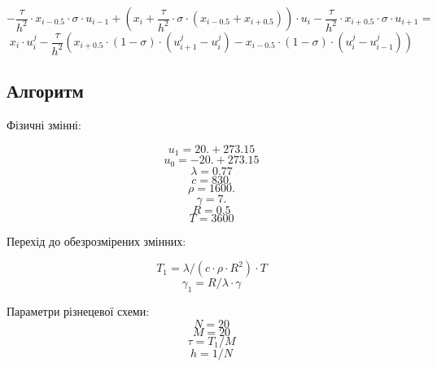 \documentclass[fontsize=14pt,DIV=1,a4paper]{scrartcl}
\begin{document}
	\begin{equation}
		- \frac{\tau}{h^2}\cdot x_{i-0.5}\cdot\sigma \cdot u_{i-1}
		+(x_i+\frac{\tau}{h^2}\cdot \sigma \cdot (x_{i-0.5}+x_{i+0.5}))\cdot u_i
		- \frac{\tau}{h^2}\cdot x_{i+0.5}\cdot\sigma \cdot u_{i+1}=
	\end{equation}
	\begin{equation}
		x_i \cdot u^j_i - \frac{\tau}{h^2}(
		  x_{i+0.5}\cdot(1- \sigma) \cdot (u^{j}_{i+1}-u^{j}_{i})
		- x_{i-0.5}\cdot(1- \sigma) \cdot (u^{j}_i    -u^{j}_{i-1}))
	\end{equation}
			
	\newpage
	\subsection{Алгоритм}
	Фізичні змінні:
	
	\begin{equation}
		u_1 = 20. + 273.15
	\end{equation}
	\begin{equation}
		u_0 = -20. + 273.15
	\end{equation}
	\begin{equation}
		\lambda = 0.77
	\end{equation}
	\begin{equation}
		c = 830.
	\end{equation}
	\begin{equation}
		\rho = 1600.
	\end{equation}
	\begin{equation}
		\gamma = 7.
	\end{equation}
	\begin{equation}
		R = 0.5
	\end{equation}
	\begin{equation}
		T = 3600
	\end{equation}
	
	Перехід до обезрозмірених змінних:
	
	\begin{equation}
		T_1 = \lambda / (c \cdot \rho \cdot R^2) \cdot T
	\end{equation}
	\begin{equation}
		\gamma_1 = R / \lambda \cdot \gamma
	\end{equation}
	
	Параметри різнецевої схеми:
	\begin{equation}
		N = 20
	\end{equation}
	\begin{equation}
		M = 20
	\end{equation}
	\begin{equation}
		\tau = T_1/M
	\end{equation}
	\begin{equation}
		h = 1 / N
	\end{equation}
	
\end{document}
